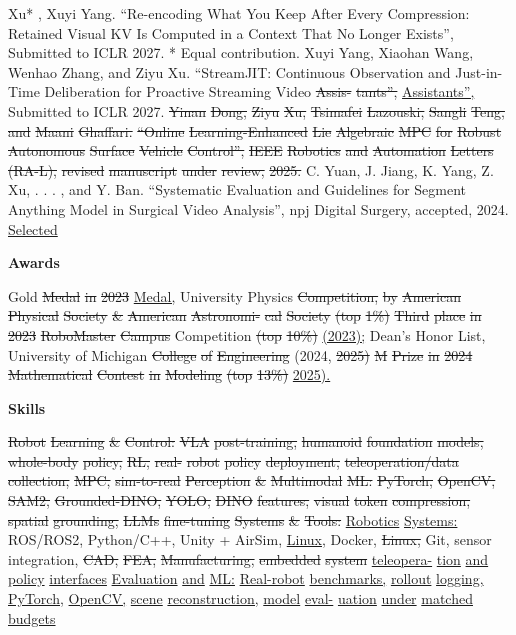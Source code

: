 \documentclass[10pt,letterpaper]{article}
\newcommand{\del}[1]{{\color{red}\sout{#1}}}
\newcommand{\add}[1]{{\color{blue}\uline{#1}}}
\begin{document}
Xu* , Xuyi Yang. ``Re-encoding What You Keep After Every Compression: Retained Visual KV Is Computed in a Context That No Longer Exists'', Submitted to ICLR 2027. * Equal contribution.  Xuyi Yang, Xiaohan Wang, Wenhao Zhang, and Ziyu Xu. ``StreamJIT: Continuous Observation and Just-in-Time Deliberation for Proactive Streaming Video \del{Assis-} \del{tants'',} \add{Assistants'',} Submitted to ICLR 2027. \del{} \del{Yinan} \del{Dong,} \del{Ziyu} \del{Xu,} \del{Tsimafei} \del{Lazouski,} \del{Sangli} \del{Teng,} \del{and} \del{Maani} \del{Ghaffari.} \del{``Online} \del{Learning-Enhanced} \del{Lie} \del{Algebraic} \del{MPC} \del{for} \del{Robust} \del{Autonomous} \del{Surface} \del{Vehicle} \del{Control'',} \del{IEEE} \del{Robotics} \del{and} \del{Automation} \del{Letters} \del{(RA-L),} \del{revised} \del{manuscript} \del{under} \del{review,} \del{2025.}  C. Yuan, J. Jiang, K. Yang, Z. Xu, . . . , and Y. Ban. ``Systematic Evaluation and Guidelines for Segment Anything Model in Surgical Video Analysis'', npj Digital Surgery, accepted, 2024. \add{Selected} \par\medskip\textbf{Awards}\par  \del{} Gold \del{Medal} \del{in} \del{2023} \add{Medal,} University Physics \del{Competition,} \del{by} \del{American} \del{Physical} \del{Society} \del{\&} \del{American} \del{Astronomi-} \del{cal} \del{Society} \del{(top} \del{1\%)} \del{} \del{Third} \del{place} \del{in} \del{2023} \del{RoboMaster} \del{Campus} Competition \del{(top} \del{10\%)} \del{} \add{(2023);} Dean's Honor List, University of Michigan \del{College} \del{of} \del{Engineering} (2024, \del{2025)} \del{} \del{M} \del{Prize} \del{in} \del{2024} \del{Mathematical} \del{Contest} \del{in} \del{Modeling} \del{(top} \del{13\%)} \add{2025).} \par\medskip\textbf{Skills}\par   \del{Robot} \del{Learning} \del{\&} \del{Control:} \del{VLA} \del{post-training,} \del{humanoid} \del{foundation} \del{models,} \del{whole-body} \del{policy,} \del{RL,} \del{real-} \del{robot} \del{policy} \del{deployment,} \del{teleoperation/data} \del{collection,} \del{MPC,} \del{sim-to-real} \del{} \del{Perception} \del{\&} \del{Multimodal} \del{ML:} \del{PyTorch,} \del{OpenCV,} \del{SAM2,} \del{Grounded-DINO,} \del{YOLO,} \del{DINO} \del{features,} \del{visual} \del{token} \del{compression,} \del{spatial} \del{grounding,} \del{LLMs} \del{fine-tuning} \del{} \del{Systems} \del{\&} \del{Tools:} \add{Robotics} \add{Systems:} ROS/ROS2, Python/C++, Unity + AirSim, \add{Linux,} Docker, \del{Linux,} Git, sensor integration, \del{CAD,} \del{FEA,} \del{Manufacturing,} \del{embedded} \del{system} \add{teleopera-} \add{tion} \add{and} \add{policy} \add{interfaces} \add{} \add{Evaluation} \add{and} \add{ML:} \add{Real-robot} \add{benchmarks,} \add{rollout} \add{logging,} \add{PyTorch,} \add{OpenCV,} \add{scene} \add{reconstruction,} \add{model} \add{eval-} \add{uation} \add{under} \add{matched} \add{budgets}\end{document}
\end{document}
